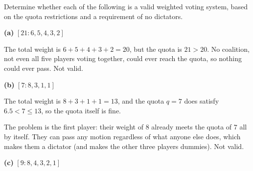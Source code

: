 \documentclass[12pt]{ximera}
\begin{document}
\begin{problem}
Determine whether each of the following is a valid weighted voting system, based on
the quota restrictions and a requirement of no dictators.

\begin{prompt}
\textbf{(a)} $[21:6,5,4,3,2]$

\begin{multipleChoice}
\end{multipleChoice}

\begin{feedback}
The total weight is $6+5+4+3+2 = 20$, but the quota is $21 > 20$. No coalition, not
even all five players voting together, could ever reach the quota, so nothing could
ever pass. Not valid.
\end{feedback}
\end{prompt}

\begin{prompt}
\textbf{(b)} $[7:8,3,1,1]$

\begin{multipleChoice}
\end{multipleChoice}

\begin{feedback}
The total weight is $8+3+1+1 = 13$, and the quota $q=7$ does satisfy
$6.5 < 7 \le 13$, so the quota itself is fine.

The problem is the first player: their weight of $8$ already meets the quota of $7$
all by itself. They can pass any motion regardless of what anyone else does, which
makes them a dictator (and makes the other three players dummies). Not valid.
\end{feedback}
\end{prompt}

\begin{prompt}
\textbf{(c)} $[9:8,4,3,2,1]$

\begin{multipleChoice}
\end{multipleChoice}


\end{prompt}
\end{problem}
\end{document}
